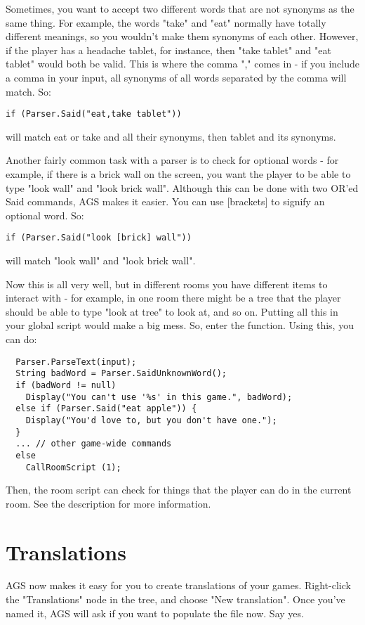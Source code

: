 Sometimes, you want to accept two different words that are not synonyms as
the same thing. For example, the words "take" and "eat" normally have totally
different meanings, so you wouldn't make them synonyms of each other. However,
if the player has a headache tablet, for instance, then "take tablet" and
"eat tablet" would both be valid. This is where the comma "," comes in - if
you include a comma in your input, all synonyms of all words separated by
the comma will match. So:
\begin{verbatim}
if (Parser.Said("eat,take tablet"))
\end{verbatim}
will match eat or take and all their synonyms, then tablet and its synonyms.

Another fairly common task with a parser is to check for optional words - for example,
if there is a brick wall on the screen, you want the player to be able to type "look wall"
and "look brick wall". Although this can be done with two OR'ed Said commands, AGS makes it
easier. You can use [brackets] to signify an optional word. So:
\begin{verbatim}
if (Parser.Said("look [brick] wall"))
\end{verbatim}
will match "look wall" and "look brick wall".

Now this is all very well, but in different rooms you have different items to interact
with - for example, in one room there might be a tree that the player should be able
to type "look at tree" to look at, and so on. Putting all this in your global script would make
a big mess. So, enter the  function. Using this,
you can do:
\begin{verbatim}
  Parser.ParseText(input);
  String badWord = Parser.SaidUnknownWord();
  if (badWord != null)
    Display("You can't use '%s' in this game.", badWord);
  else if (Parser.Said("eat apple")) {
    Display("You'd love to, but you don't have one.");
  }
  ... // other game-wide commands
  else
    CallRoomScript (1);
\end{verbatim}

Then, the room script can check for things that the player can do in the current room.
See the  description for more information.

\section{Translations}%

AGS now makes it easy for you to create translations of your games.
Right-click the "Translations" node in the tree, and choose "New translation". Once
you've named it, AGS will ask if you want to populate the file now. Say yes.

